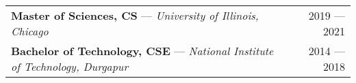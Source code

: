 \begin{tabularx}{\textwidth}{Xr}
\textbf{Master of Sciences, CS} --- \textit{University of Illinois, Chicago} & 2019 --- 2021 \\
\textbf{Bachelor of Technology, CSE} --- \textit{National Institute of Technology, Durgapur} & 2014 --- 2018 \\
\end{tabularx}